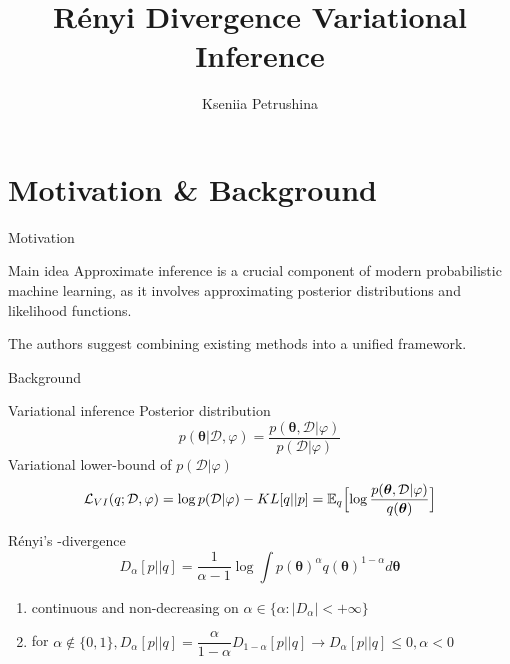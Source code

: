 \documentclass{beamer}
\title{Rényi Divergence Variational Inference}
\author{Kseniia Petrushina}
\institute{MIPT, 2023}
\begin{document}
\begin{frame}
    \titlepage
\end{frame}


\begin{frame}
    \tableofcontents
\end{frame}


\section{Motivation \& Background}
\begin{frame}{Motivation}
    \begin{block}{Main idea}
    Approximate inference is a crucial component of modern probabilistic machine learning, as it involves approximating posterior distributions and likelihood functions.

    The authors suggest combining existing methods into a unified framework.
    \end{block} 
\end{frame}


\begin{frame}{Background}
 \begin{block}{Variational inference}
    Posterior distribution
    \begin{equation}
        p(\boldsymbol{\theta}| \mathcal{D}, \varphi) = \dfrac{p(\boldsymbol{\theta}, \mathcal{D}| \varphi)}{p(\mathcal{D} | \varphi)}
    \end{equation}
    Variational lower-bound of $p(\mathcal{D}|\varphi)$
    \begin{equation}
        \mathcal{L}_{VI}(q; \mathcal{D}, \varphi) = \log{p (\mathcal{D}| \varphi)} - KL [q || p] = \mathbb{E}_q \Bigl[ \log{\dfrac{p(\boldsymbol{\theta}, \mathcal{D}| \varphi)}{q(\boldsymbol{\theta})}} \Bigr]
    \end{equation}
    \end{block}
    
    \begin{block}{Rényi’s \alpha-divergence}
    \begin{equation}
        D_\alpha [ p || q] = \dfrac{1}{\alpha - 1}\log \int p(\boldsymbol{\theta})^\alpha q(\boldsymbol{\theta})^{1-\alpha} d \boldsymbol{\theta}
    \end{equation} 

    \begin{enumerate}
            \item continuous and non-decreasing on $\alpha \in \{\alpha: |D_\alpha| < +\infty\}$
            \item for $\alpha \not \in \{0, 1\}, D_\alpha[p || q] = \dfrac{\alpha}{1 - \alpha } D_{1-\alpha}[p || q] \rightarrow D_\alpha[p || q] \le 0, \alpha <0$
        \end{enumerate}
        
    \end{block}
\end{frame}
\end{document}
